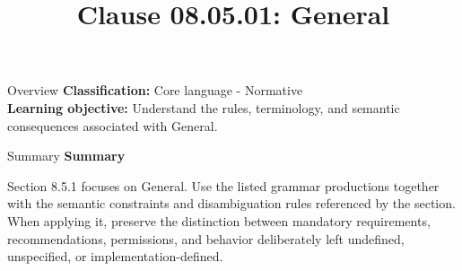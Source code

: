 \documentclass[10pt,letterpaper]{article}
\title{Clause 08.05.01: General}
\author{}
\date{}
\begin{document}
\maketitle
\begin{CornellOverviewBox}{Overview}
\textbf{Classification:} Core language - Normative\\[2pt]
\textbf{Learning objective:} Understand the rules, terminology, and semantic consequences associated with General.
\end{CornellOverviewBox}\begin{CornellSummaryBox}{Summary}
{\sffamily\bfseries\color{Accent} Summary}\par\vspace{3pt}Section 8.5.1 focuses on General. Use the listed grammar productions together with the semantic constraints and disambiguation rules referenced by the section. When applying it, preserve the distinction between mandatory requirements, recommendations, permissions, and behavior deliberately left undefined, unspecified, or implementation-defined.
\end{CornellSummaryBox}
\end{document}
